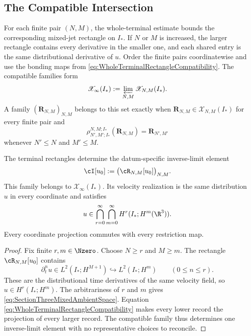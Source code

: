 \subsection{The Compatible Intersection}\label{sub:TheCompatibleIntersection}

For each finite pair \((N,M)\), the whole-terminal estimate bounds the corresponding mixed-jet rectangle on \(I_*\).
If \(N\) or \(M\) is increased, the larger rectangle contains every derivative in the smaller one, and each shared entry is the same distributional derivative of \(u\).
Order the finite pairs coordinatewise and use the bonding maps from \eqref{eq:WholeTerminalRectangleCompatibility}.
The compatible families form
\[
  \mathscr X_\infty(I_*)
  :=
  \varprojlim_{N,M}\mathscr X_{N,M}(I_*).
\]
A family \((\mathbf R_{N,M})_{N,M}\) belongs to this set exactly when \(\mathbf R_{N,M}\in\mathscr X_{N,M}(I_*)\) for every finite pair and
\[
  \rho_{N',M';I_*}^{N,M;I_*}(\mathbf R_{N,M})
  =\mathbf R_{N',M'}
\]
whenever \(N'\leq N\) and \(M'\leq M\).

\begin{proposition}\label{prop:CompatibleProjectiveAssembly}
The terminal rectangles determine the datum-specific inverse-limit element
\[
  \cI[u_0]
  :=
  \bigl(\cR_{N,M}[u_0]\bigr)_{N,M}.
\]
This family belongs to \(\mathscr X_\infty(I_*)\).
Its velocity realization is the same distribution \(u\) in every coordinate and satisfies
\begin{equation}\label{eq:SectionThreeMixedAmbientSpace}
  u\in
  \bigcap_{r=0}^{\infty}
  \bigcap_{m=0}^{\infty}
  H^r(I_*;H^m(\R^3)).
\end{equation}
Every coordinate projection commutes with every restriction map.
\end{proposition}

\begin{proof}
Fix finite \(r,m\in\Nzero\).
Choose \(N\geq r\) and \(M\geq m\).
The rectangle \(\cR_{N,M}[u_0]\) contains
\[
  \partial_t^n u\in L^2(I_*;H^{M+1})
  \hookrightarrow L^2(I_*;H^m)
  \qquad(0\leq n\leq r).
\]
These are the distributional time derivatives of the same velocity field, so \(u\in H^r(I_*;H^m)\).
The arbitrariness of \(r\) and \(m\) gives \eqref{eq:SectionThreeMixedAmbientSpace}.
Equation \eqref{eq:WholeTerminalRectangleCompatibility} makes every lower record the projection of every larger record.
The compatible family thus determines one inverse-limit element with no representative choices to reconcile.
\end{proof}

